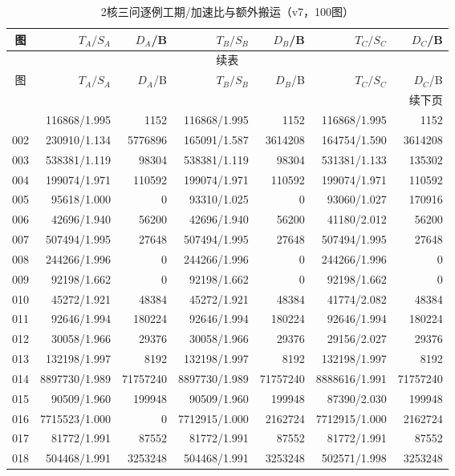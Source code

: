 \begin{longtable}{crrrrrr}
\caption{2核三问逐例工期/加速比与额外搬运（v7，100图）}\label{tab:detail-2}\\
\toprule
图 & $T_A/S_A$ & $D_A$/B & $T_B/S_B$ & $D_B$/B & $T_C/S_C$ & $D_C$/B \\
\midrule
\endfirsthead
\multicolumn{7}{c}{续表}\\
\toprule
图 & $T_A/S_A$ & $D_A$/B & $T_B/S_B$ & $D_B$/B & $T_C/S_C$ & $D_C$/B \\
\midrule
\endhead
\midrule\multicolumn{7}{r}{续下页}\\
\endfoot
\bottomrule
\endlastfoot
001 & 116868/1.995 & 1152 & 116868/1.995 & 1152 & 116868/1.995 & 1152 \\
002 & 230910/1.134 & 5776896 & 165091/1.587 & 3614208 & 164754/1.590 & 3614208 \\
003 & 538381/1.119 & 98304 & 538381/1.119 & 98304 & 531381/1.133 & 135302 \\
004 & 199074/1.971 & 110592 & 199074/1.971 & 110592 & 199074/1.971 & 110592 \\
005 & 95618/1.000 & 0 & 93310/1.025 & 0 & 93060/1.027 & 170916 \\
006 & 42696/1.940 & 56200 & 42696/1.940 & 56200 & 41180/2.012 & 56200 \\
007 & 507494/1.995 & 27648 & 507494/1.995 & 27648 & 507494/1.995 & 27648 \\
008 & 244266/1.996 & 0 & 244266/1.996 & 0 & 244266/1.996 & 0 \\
009 & 92198/1.662 & 0 & 92198/1.662 & 0 & 92198/1.662 & 0 \\
010 & 45272/1.921 & 48384 & 45272/1.921 & 48384 & 41774/2.082 & 48384 \\
011 & 92646/1.994 & 180224 & 92646/1.994 & 180224 & 92646/1.994 & 180224 \\
012 & 30058/1.966 & 29376 & 30058/1.966 & 29376 & 29156/2.027 & 29376 \\
013 & 132198/1.997 & 8192 & 132198/1.997 & 8192 & 132198/1.997 & 8192 \\
014 & 8897730/1.989 & 71757240 & 8897730/1.989 & 71757240 & 8888616/1.991 & 71757240 \\
015 & 90509/1.960 & 199948 & 90509/1.960 & 199948 & 87390/2.030 & 199948 \\
016 & 7715523/1.000 & 0 & 7712915/1.000 & 2162724 & 7712915/1.000 & 2162724 \\
017 & 81772/1.991 & 87552 & 81772/1.991 & 87552 & 81772/1.991 & 87552 \\
018 & 504468/1.991 & 3253248 & 504468/1.991 & 3253248 & 502571/1.998 & 3253248 \\

\end{longtable}
